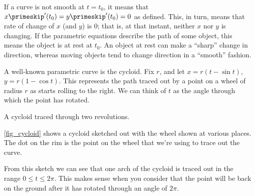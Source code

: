If a curve is not smooth at $t=t_0$, it means that $x\primeskip'(t_0)=y\primeskip'(t_0)=0$ as defined. This, in turn, means that rate of change of $x$ (and $y$) is 0; that is, at that instant, neither $x$ nor $y$ is changing. If the parametric equations describe the path of some object, this means the object is at rest at $t_0$. An object at rest can make a ``sharp'' change in direction, whereas moving objects tend to change direction in a ``smooth'' fashion.

\begin{example}\label{ex_cycloid}
A well-known parametric curve is the cycloid.  Fix $r$, and let $x=r(t-\sin t)$, $y=r(1-\cos t)$.  This represents the path traced out by a point on a wheel of radius $r$ as starts rolling to the right.  We can think of $t$ as the angle through which the point has rotated.
 
\noindent\begin{minipage}[t]{\linewidth}\noindent%
\captionsetup{type=figure}%
 \centering
 \caption{A cycloid traced through two revolutions.}
 \label{fig_cycloid}
\end{minipage}
 
\autoref{fig_cycloid} shows a cycloid sketched out with the wheel shown at various places.  The dot on the rim is the point on the wheel that we're using to trace out the curve.
 
From this sketch we can see that one arch of the cycloid is traced out in the range $0\le t\le2\pi$.  This makes sense when you consider that the point will be back on the ground after it has rotated through an angle of $2\pi$.
\end{example}

